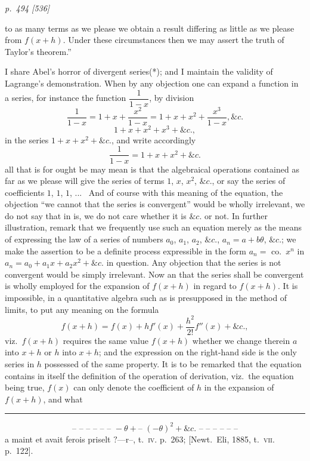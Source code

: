 \documentclass[11pt,a4paper]{book}
\begin{document}
\clearpage

\bigskip
\textit{p.~494 [536]}
\smallskip

\noindent
to as many terms as we please we obtain a result differing as little as we please
from $f(x + h)$. Under these circumstances then we may assert the truth of Taylor's
theorem.''

I share Abel's horror of divergent series(*); and I maintain the validity of Lagrange's
demonstration. When by any objection one can expand a function in a series, for
instance the function $\dfrac{1}{1-x}$, by division
\[
\dfrac{1}{1-x}=1+x+\dfrac{x^2}{1-x}=1+x+x^2+\dfrac{x^3}{1-x},\&c.
\]
\[
1 + x + x^2 + x^3 + \&c.,
\]
in the series $1 + x + x^2 + \&c.$, and write accordingly
\[
\frac{1}{1 - x} = 1 + x + x^2 + \&c.
\]
all that is for ought be may mean is that the algebraical operations contained as far
as we please will give the series of terms $1$, $x$, $x^2$, $\&c.$, or say the series of coefficients
$1$, $1$, $1$, ... \, And of course with this meaning of the equation, the objection ``we cannot
that the series is convergent'' would be wholly irrelevant, we do not say that
in is, we do not care whether it is $\&c.$ or not. In further illustration, remark that
we frequently use such an equation merely as the means of expressing the law of a
series of numbers $a_0$, $a_1$, $a_2$, $\&c.$, $a_n = a + b\theta$, $\&c.$; we make the assertion
to be a definite process expressible in the form $a_n = $ co.\ $x^n$ in $a_n = a_0 + a_1 x + a_2 x^2 + \&c.$ in question.
Any objection that the series is not convergent would be simply irrelevant. Now an
that the series shall be convergent is wholly employed for the expansion of $f(x + h)$
in regard to $f(x + h)$. It is impossible, in a quantitative algebra such as is presupposed
in the method of limits, to put any meaning on the formula
\[
f(x + h) = f(x) + hf'(x) + \frac{h^2}{2!}f''(x) + \&c.,
\]
viz.\ $f(x + h)$ requires the same value $f(x + h)$ whether we change therein $a$ into
$x + h$ or $h$ into $x + h$; and the expression on the right-hand side is the only series
in $h$ possessed of the same property. It is to be remarked that the equation contains
in itself the definition of the operation of derivation, viz.\ the equation being true,
$f(x)$ can only denote the coefficient of $h$ in the expansion of $f(x + h)$, and what

\smallskip
\noindent\rule{0.45\textwidth}{0.4pt}
$$\text{ -- -- -- -- -- -- }-\theta + \text{-- }(-\theta)^2 + \&c.\text{ -- -- -- -- -- -- }$$
{\footnotesize a maint et avait ferois priselt $? $---r--, t.\ \textsc{iv}. p.\ 263; [Newt.\ Eli, 1885, t.\ \textsc{vii}. p.\ 122].}
\end{document}
